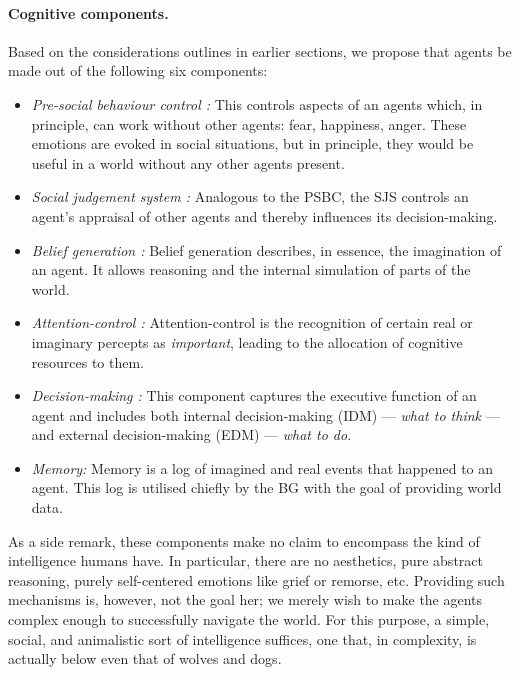 \paragraph{Cognitive components.} Based on the considerations outlines in earlier sections, we propose that agents be made out of the following six components:

\begin{itemize}
	\item \emph{Pre-social behaviour control :} This controls aspects of an agents which, in principle, can work without other agents: fear, happiness, anger.  These emotions are evoked in social situations, but in principle, they would be useful in a world without any other agents present.
	\item \emph{Social judgement system :} Analogous to the \textsc{PSBC}, the \textsc{SJS} controls an agent's appraisal of other agents and thereby influences its decision-making.
	\item \emph{Belief generation :} Belief generation describes, in essence, the imagination of an agent. It allows reasoning and the internal simulation of parts of the world.
	\item \emph{Attention-control :} Attention-control is the recognition of certain real or imaginary percepts as {\em important}, leading to the allocation of cognitive resources to them.
	\item \emph{Decision-making :} This component captures the executive function of an agent and includes both internal decision-making (IDM) --- {\em what to think} --- and external decision-making (EDM) --- {\em what to do}.
	\item \emph{Memory:} Memory is a log of imagined and real events that happened to an agent. This log is utilised chiefly by the \textsc{BG} with the goal of providing world data.
\end{itemize}

As a side remark, these components make no claim to encompass the kind of intelligence humans have. In particular, there are no aesthetics, pure abstract reasoning,  purely self-centered emotions like grief or remorse, etc. Providing such mechanisms is, however, not the goal her; we merely wish to make the agents complex enough to successfully navigate the world. For this purpose, a simple, social, and animalistic sort of intelligence suffices, one that, in complexity, is actually below even that of wolves and dogs.

